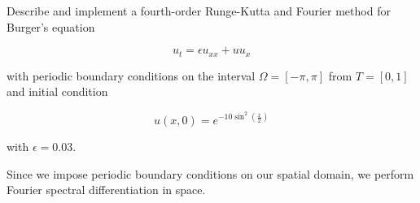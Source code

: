 Describe and implement a fourth-order Runge-Kutta and Fourier method for Burger's equation 

$$
u_t = \epsilon u_{xx} + u u_x
$$

with periodic boundary conditions on the interval $\Omega = [-\pi, \pi]$ from $T = [0, 1]$ and initial condition

$$
u(x, 0) = e^{-10 \sin^2{\left( \frac{x}{2} \right)}}
$$

with $\epsilon = 0.03$.

\begin{solution}
  Since we impose periodic boundary conditions on our spatial domain, we perform Fourier spectral differentiation in 
  space.
  \ \\
  \vfill
\end{solution}